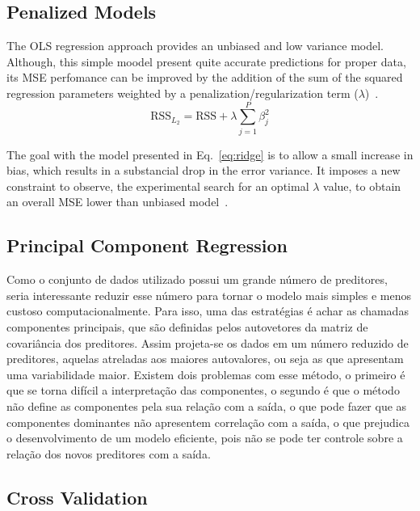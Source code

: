 
\subsection{Penalized Models}
The OLS regression approach provides an unbiased and low variance model. Although, this simple moodel present quite accurate predictions for proper data, its MSE perfomance can be improved by the addition of the sum of the squared regression parameters weighted by a penalization/regularization term ($\lambda$)~\cite{Kuhn2013}.
\begin{equation}
  \text{RSS}_{L_2} = \text{RSS} + \lambda \sum_{j = 1}^{P} \beta_{j}^2
  \label{eq:ridge}
\end{equation}

The goal with the model presented in Eq.~\ref{eq:ridge} is to allow a small increase in bias, which results in a substancial drop in the error variance. It imposes a new constraint to observe, the experimental search for an optimal $\lambda$ value, to obtain an overall MSE lower than unbiased model~\cite{James2013, Kuhn2013}.


\subsection{Principal Component Regression}
Como o conjunto de dados utilizado possui um grande
número de preditores, seria interessante reduzir esse número para tornar o modelo mais simples e menos custoso computacionalmente. Para isso, uma das estratégias é achar as chamadas componentes principais, que são definidas pelos autovetores da matriz de covariância dos preditores. Assim projeta-se os dados em um número reduzido de preditores, aquelas atreladas aos maiores autovalores, ou seja as que apresentam uma variabilidade maior. Existem dois problemas com esse método, o primeiro é que se torna difícil a interpretação das componentes, o segundo é que o método não define as componentes pela sua relação com a saída, o que pode fazer que as componentes dominantes não apresentem correlação com a saída, o que prejudica o desenvolvimento de um modelo eficiente, pois não se pode ter controle sobre a relação dos novos preditores com a saída.

\subsection{Cross Validation}

